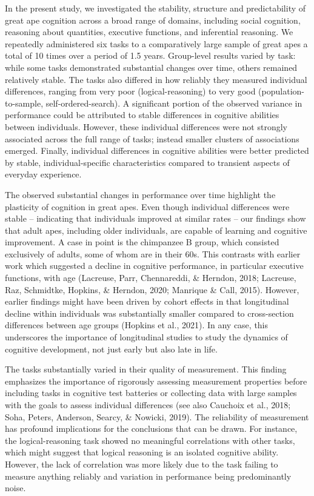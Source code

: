 \documentclass[
  man,floatsintext]{apa6}
\begin{document}
In the present study, we investigated the stability, structure and predictability of great ape cognition across a broad range of domains, including social cognition, reasoning about quantities, executive functions, and inferential reasoning. We repeatedly administered six tasks to a comparatively large sample of great apes a total of 10 times over a period of 1.5 years. Group-level results varied by task: while some tasks demonstrated substantial changes over time, others remained relatively stable. The tasks also differed in how reliably they measured individual differences, ranging from very poor (logical-reasoning) to very good (population-to-sample, self-ordered-search). A significant portion of the observed variance in performance could be attributed to stable differences in cognitive abilities between individuals. However, these individual differences were not strongly associated across the full range of tasks; instead smaller clusters of associations emerged. Finally, individual differences in cognitive abilities were better predicted by stable, individual-specific characteristics compared to transient aspects of everyday experience.

The observed substantial changes in performance over time highlight the plasticity of cognition in great apes. Even though individual differences were stable -- indicating that individuals improved at similar rates -- our findings show that adult apes, including older individuals, are capable of learning and cognitive improvement. A case in point is the chimpanzee B group, which consisted exclusively of adults, some of whom are in their 60s. This contrasts with earlier work which suggested a decline in cognitive performance, in particular executive functions, with age (Lacreuse, Parr, Chennareddi, \& Herndon, 2018; Lacreuse, Raz, Schmidtke, Hopkins, \& Herndon, 2020; Manrique \& Call, 2015). However, earlier findings might have been driven by cohort effects in that longitudinal decline within individuals was substantially smaller compared to cross-section differences between age groups (Hopkins et al., 2021). In any case, this underscores the importance of longitudinal studies to study the dynamics of cognitive development, not just early but also late in life.

The tasks substantially varied in their quality of measurement. This finding emphasizes the importance of rigorously assessing measurement properties before including tasks in cognitive test batteries or collecting data with large samples with the goals to assess individual differences (see also Cauchoix et al., 2018; Soha, Peters, Anderson, Searcy, \& Nowicki, 2019). The reliability of measurement has profound implications for the conclusions that can be drawn. For instance, the logical-reasoning task showed no meaningful correlations with other tasks, which might suggest that logical reasoning is an isolated cognitive ability. However, the lack of correlation was more likely due to the task failing to measure anything reliably and variation in performance being predominantly noise.
\end{document}
